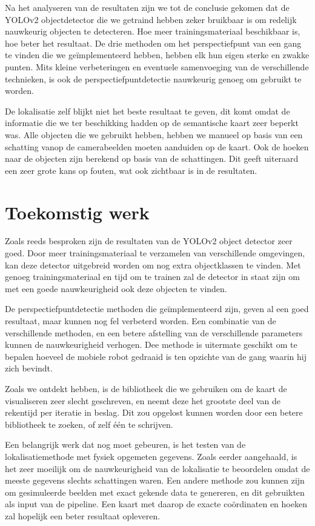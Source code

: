 Na het analyseren van de resultaten zijn we tot de conclusie gekomen dat de YOLOv2 objectdetector die we getraind hebben zeker bruikbaar is
om redelijk nauwkeurig objecten te detecteren. Hoe meer trainingsmateriaal beschikbaar is, hoe beter het resultaat.
De drie methoden om het perspectiefpunt van een gang te vinden die we ge\"{i}mplementeerd hebben, hebben elk hun eigen sterke en zwakke punten.
Mits kleine verbeteringen en eventuele samenvoeging van de verschillende technieken,
is ook de perspectiefpuntdetectie nauwkeurig genoeg om gebruikt te worden.

De lokalisatie zelf blijkt niet het beste resultaat te geven, dit komt omdat de informatie die we ter beschikking hadden op de semantische kaart zeer beperkt was.
Alle objecten die we gebruikt hebben, hebben we manueel op basis van een schatting vanop de camerabeelden moeten aanduiden op de kaart.
Ook de hoeken naar de objecten zijn berekend op basis van de schattingen.
Dit geeft uiteraard een zeer grote kans op fouten, wat ook zichtbaar is in de resultaten.


\section{Toekomstig werk}
Zoals reeds besproken zijn de resultaten van de YOLOv2 object detector zeer goed.
Door meer trainingsmateriaal te verzamelen van verschillende omgevingen, kan deze detector uitgebreid worden om nog extra objectklassen te vinden.
Met genoeg trainingsmateriaal en tijd om te trainen zal de detector in staat zijn om met een goede nauwkeurigheid ook deze objecten te vinden.

De perspectiefpuntdetectie methoden die ge\"{i}mplementeerd zijn, geven al een goed resultaat, maar kunnen nog fel verbeterd worden.
Een combinatie van de verschillende methoden, en een betere afstelling van de verschillende parameters kunnen de nauwkeurigheid verhogen.
Dee methode is uitermate geschikt om te bepalen hoeveel de mobiele robot gedraaid is ten opzichte van de gang waarin hij zich bevindt.

Zoals we ontdekt hebben, is de bibliotheek die we gebruiken om de kaart de visualiseren zeer slecht geschreven, en neemt deze het grootste deel van
de rekentijd per iteratie in beslag.
Dit zou opgelost kunnen worden door een betere bibliotheek te zoeken, of zelf \'{e}\'{e}n te schrijven.

Een belangrijk werk dat nog moet gebeuren, is het testen van de lokalisatiemethode met fysiek opgemeten gegevens.
Zoals eerder aangehaald, is het zeer moeilijk om de nauwkeurigheid van de lokalisatie te beoordelen omdat de meeste gegevens slechts schattingen waren.
Een andere methode zou kunnen zijn om gesimuleerde beelden met exact gekende data te genereren, en dit gebruikten als input van de pipeline.
Een kaart met daarop de exacte co\"{o}rdinaten en hoeken zal hopelijk een beter resultaat opleveren.